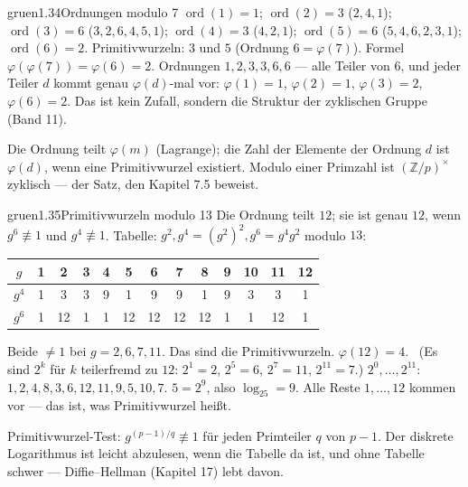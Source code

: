 \begin{loesungkarte}{gruen}{1.34}{Ordnungen modulo 7}
$\operatorname{ord}(1) = 1$; $\operatorname{ord}(2) = 3$ ($2, 4, 1$); $\operatorname{ord}(3) = 6$ ($3, 2, 6, 4, 5, 1$); $\operatorname{ord}(4) = 3$ ($4, 2, 1$); $\operatorname{ord}(5) = 6$ ($5, 4, 6, 2, 3, 1$); $\operatorname{ord}(6) = 2$.
Primitivwurzeln: $3$ und $5$ (Ordnung $6 = \varphi(7)$). Formel $\varphi(\varphi(7)) = \varphi(6) = 2$. \checkmark
{}
Ordnungen $1, 2, 3, 3, 6, 6$ --- alle Teiler von $6$, und jeder Teiler $d$ kommt genau $\varphi(d)$-mal vor: $\varphi(1) = 1$, $\varphi(2) = 1$, $\varphi(3) = 2$, $\varphi(6) = 2$. Das ist kein Zufall, sondern die Struktur der zyklischen Gruppe (Band 11).
\begin{mitnehmen}\kastentext
Die Ordnung teilt $\varphi(m)$ (Lagrange); die Zahl der Elemente der Ordnung $d$ ist $\varphi(d)$, wenn eine Primitivwurzel existiert. Modulo einer Primzahl ist $(\mathbb Z/p)^{\times}$ zyklisch --- der Satz, den Kapitel 7.5 beweist.
\end{mitnehmen}
\end{loesungkarte}

\begin{loesungkarte}{gruen}{1.35}{Primitivwurzeln modulo 13}
Die Ordnung teilt $12$; sie ist genau $12$, wenn $g^{6}\not\equiv1$ und $g^{4}\not\equiv1$. Tabelle: $g^{2}, g^{4} = (g^{2})^{2}, g^{6} = g^{4}g^{2}$ modulo $13$:
\begin{center}
{\small\renewcommand{\arraystretch}{1.25}
\begin{tabular}{@{}c|cccccccccccc@{}}
$g$ & 1 & 2 & 3 & 4 & 5 & 6 & 7 & 8 & 9 & 10 & 11 & 12\\\hline
$g^{4}$ & 1 & 3 & 3 & 9 & 1 & 9 & 9 & 1 & 9 & 3 & 3 & 1\\
$g^{6}$ & 1 & 12 & 1 & 1 & 12 & 12 & 12 & 12 & 1 & 1 & 12 & 1\\
\end{tabular}}
\end{center}
Beide $\neq1$ bei $g = 2, 6, 7, 11$. Das sind die Primitivwurzeln.
$\varphi(12) = 4$. \checkmark\ (Es sind $2^{k}$ für $k$ teilerfremd zu $12$: $2^{1} = 2$, $2^{5} = 6$, $2^{7} = 11$, $2^{11} = 7$.)
$2^{0}, \dots, 2^{11}$: $1, 2, 4, 8, 3, 6, 12, 11, 9, 5, 10, 7$. $5 = 2^{9}$, also $\log_25 = 9$. Alle Reste $1, \dots, 12$ kommen vor --- das ist, was Primitivwurzel heißt.
\begin{mitnehmen}\kastentext
Primitivwurzel-Test: $g^{(p-1)/q}\not\equiv1$ für jeden Primteiler $q$ von $p - 1$. Der diskrete Logarithmus ist leicht abzulesen, wenn die Tabelle da ist, und ohne Tabelle schwer --- Diffie--Hellman (Kapitel 17) lebt davon.
\end{mitnehmen}
\end{loesungkarte}

